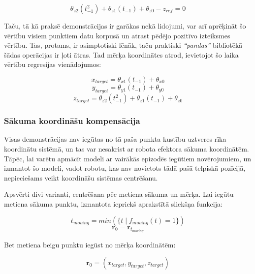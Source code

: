\documentclass[12pt, a4paper]{article}
\numberwithin{equation}{section} %
\begin{document}
\begin{equation}
    \theta_{z2}(t_{-1}^2) + \theta_{z1}(t_{-1}) + \theta_{z0} - z_{ref} = 0
\end{equation}

Taču, tā kā praksē demonstrācijas ir garākas nekā lidojumi, var arī aprēķināt šo vērtību visiem punktiem datu korpusā un atrast pēdējo pozitīvo izteiksmes vērtību. Tas, protams, ir asimptotiski lēnāk, taču praktiski \textit{``pandas''} bibliotēkā šādas operācijas ir ļoti ātras. Tad mērķa koordinātes atrod, ievietojot šo laika vērtību regresijas vienādojumos:

\begin{equation}
    x_{target} = \theta_{x1}(t_{-1}) + \theta_{x0}
\end{equation}
\begin{equation}
    y_{target} = \theta_{y1}(t_{-1}) + \theta_{y0}
\end{equation}
\begin{equation}
    z_{target} = \theta_{z2}(t_{-1}^2) + \theta_{z1}(t_{-1}) + \theta_{z0}
\end{equation}

\subsubsection{Sākuma koordināšu kompensācija}

Visas demonstrācijas nav iegūtas no tā paša punkta kustību uztveres rīka koordinātu sistēmā, un tas var nesakrist ar robota efektora sākuma koordinātēm. Tāpēc, lai varētu apmācīt modeli ar vairākās epizodēs iegūtiem novērojumiem, un izmantot šo modeli, vadot robotu, kas nav novietots tādā pašā telpiskā pozīcijā, nepieciešams veikt koordināšu sistēmas centrēšanu.

Apsvērti divi varianti, centrēšana pēc metiena sākuma un mērķa. Lai iegūtu metiena sākuma punktu, izmantota iepriekš aprakstītā sliekšņa funkcija:

\begin{equation}
    t_{moving} = min(\lbrace t \mid f_{moving}(t) = 1 \rbrace)
\end{equation}
\begin{equation}
     \boldsymbol{r}_{0} =  \boldsymbol{r}_{t_{moving}}
\end{equation}

Bet metiena beigu punktu iegūst no mērķa koordinātēm:

\begin{equation}
     \boldsymbol{r}_{0} = ( x_{target}, y_{target}, z_{target} )
\end{equation}
\end{document}
